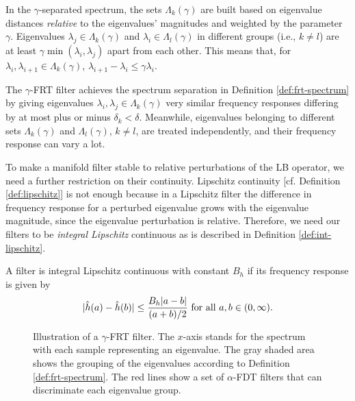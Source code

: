 In the $\gamma$-separated spectrum, the sets $\Lambda_k(\gamma)$ are built based on eigenvalue distances \textit{relative} to the eigenvalues' magnitudes and weighted by the parameter $\gamma$. Eigenvalues $\lambda_j \in \Lambda_k(\gamma)$ and $\lambda_i \in \Lambda_l(\gamma)$ in different groups (i.e., $k \neq l$) are at least $\gamma\min(\lambda_i,\lambda_j)$ apart from each other. This means that, for $\lambda_i, \lambda_{i+1} \in \Lambda_k(\gamma)$, $\lambda_{i+1} - \lambda_i \leq \gamma \lambda_i$.

The $\gamma$-FRT filter achieves the spectrum separation in Definition \ref{def:frt-spectrum} by giving eigenvalues $\lambda_i, \lambda_j \in \Lambda_k(\gamma)$ very similar frequency responses differing by at most plus or minus $\delta_k < \delta$. Meanwhile, eigenvalues belonging to different sets $\Lambda_k(\gamma)$ and $\Lambda_l(\gamma)$, $k \neq l$, are treated independently, and their frequency response can vary a lot.

To make a manifold filter stable to relative perturbations of the LB operator, we need a further restriction on their continuity. Lipschitz continuity [cf. Definition \ref{def:lipschitz}] is not enough because in a Lipschitz filter the difference in frequency response for a perturbed eigenvalue grows with the eigenvalue magnitude, since the eigenvalue perturbation is relative. Therefore, we need our filters to be \textit{integral Lipschitz} continuous as is described in Definition \ref{def:int-lipschitz}.

\begin{definition} \label{def:int-lipschitz}
A filter is integral Lipschitz continuous with constant $B_h$ if its frequency response is given by
\begin{equation}\label{eqn:filter_function}
    |{\hat h}(a)-{\hat h}(b)|\leq \frac{B_h |a-b| }{(a+b)/2} \text{ for all } a,b \in (0,\infty)\text{.}
\end{equation}
\end{definition}

\begin{figure}
\centering
      
  \caption{Illustration of a $\gamma$-FRT filter. The $x$-axis stands for the spectrum with each sample representing an eigenvalue. The gray shaded area shows the grouping of the eigenvalues according to Definition \ref{def:frt-spectrum}. The red lines show a set of $\alpha$-FDT filters that can discriminate each eigenvalue group. }
\label{fig:gamma}
\end{figure}

